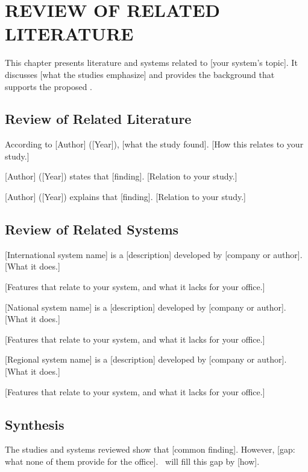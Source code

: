 \chapter{REVIEW OF RELATED LITERATURE}
This chapter presents literature and systems related to [your system's topic]. It discusses [what the studies emphasize] and provides the background that supports the proposed \SystemName.

\section{Review of Related Literature}
According to [Author] ([Year]), [what the study found]. [How this relates to your study.]

[Author] ([Year]) states that [finding]. [Relation to your study.]

[Author] ([Year]) explains that [finding]. [Relation to your study.]

\section{Review of Related Systems}
[International system name] is a [description] developed by [company or author]. [What it does.]


[Features that relate to your system, and what it lacks for your office.]

[National system name] is a [description] developed by [company or author]. [What it does.]


[Features that relate to your system, and what it lacks for your office.]

[Regional system name] is a [description] developed by [company or author]. [What it does.]


[Features that relate to your system, and what it lacks for your office.]

\section{Synthesis}
The studies and systems reviewed show that [common finding]. However, [gap: what none of them provide for the office]. \SystemName\ will fill this gap by [how].
